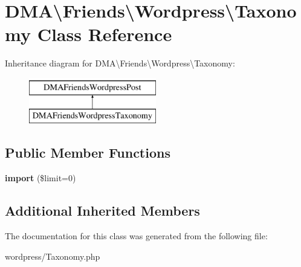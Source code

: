 \hypertarget{classDMA_1_1Friends_1_1Wordpress_1_1Taxonomy}{\section{D\+M\+A\textbackslash{}Friends\textbackslash{}Wordpress\textbackslash{}Taxonomy Class Reference}
\label{classDMA_1_1Friends_1_1Wordpress_1_1Taxonomy}
}
Inheritance diagram for D\+M\+A\textbackslash{}Friends\textbackslash{}Wordpress\textbackslash{}Taxonomy\+:\begin{figure}[H]
\begin{center}
\leavevmode
\includegraphics[height=2.000000cm]{dc/d06/classDMA_1_1Friends_1_1Wordpress_1_1Taxonomy}
\end{center}
\end{figure}
\subsection*{Public Member Functions}
\begin{DoxyCompactItemize}
\item 
\hypertarget{classDMA_1_1Friends_1_1Wordpress_1_1Taxonomy_a20c1d17d7b55872d090f6a1693a33337}{{\bfseries import} (\$limit=0)}\label{classDMA_1_1Friends_1_1Wordpress_1_1Taxonomy_a20c1d17d7b55872d090f6a1693a33337}

\end{DoxyCompactItemize}
\subsection*{Additional Inherited Members}


The documentation for this class was generated from the following file\+:\begin{DoxyCompactItemize}
\item 
wordpress/Taxonomy.\+php\end{DoxyCompactItemize}
